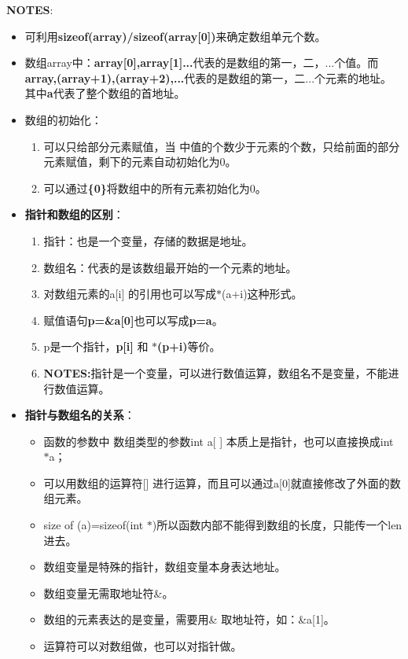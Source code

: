 \documentclass[UTF8]{ctexart}
\begin{document}
			\begin{framed}
				\textbf{NOTES}:
				\begin{itemize}
					\item 可利用\textbf{sizeof(array)/sizeof(array[0])}来确定数组单元个数。
					\item 数组array中：\textbf{array[0],array[1]...}代表的是数组的第一，二，...个值。而\textbf{array,(array+1),(array+2),...}代表的是数组的第一，二...个元素的地址。其中\textbf{a}代表了整个数组的首地址。
					\item 数组的初始化：\begin{enumerate}
						\item 可以只给部分元素赋值，当{ }中值的个数少于元素的个数，只给前面的部分元素赋值，剩下的元素自动初始化为0。
						\item 可以通过\textbf{\{0\}}将数组中的所有元素初始化为0。
					\end{enumerate}
					\item \textbf{指针和数组的区别}：\begin{enumerate}
						\item 指针：也是一个变量，存储的数据是地址。
						\item 数组名：代表的是该数组最开始的一个元素的地址。
						\item 对数组元素的a[i] 的引用也可以写成$*$(a+i)这种形式。
						\item 赋值语句\textbf{p=\&a[0]}也可以写成\textbf{p=a}。
						\item p是一个指针，\textbf{p[i]} 和 \textbf{$*$(p+i)}等价。
						\item \textbf{NOTES:}指针是一个变量，可以进行数值运算，数组名不是变量，不能进行数值运算。
					\end{enumerate}
					\item \textbf{指针与数组名的关系}：\begin{itemize}
						\item 函数的参数中 数组类型的参数int a[ ] 本质上是指针，也可以直接换成int $*$a；
						\item 可以用数组的运算符[] 进行运算，而且可以通过a[0]就直接修改了外面的数组元素。
						\item size of (a)=sizeof(int $*$)所以函数内部不能得到数组的长度，只能传一个len进去。
						\item 数组变量是特殊的指针，数组变量本身表达地址。
						\item 数组变量无需取地址符\&。
						\item 数组的元素表达的是变量，需要用\& 取地址符，如：\&a[1]。
						\item []运算符可以对数组做，也可以对指针做。

\end{itemize}
\end{itemize}
\end{framed}
\end{document}
